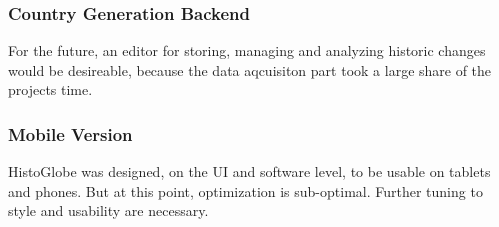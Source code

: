 \subsubsection{Country Generation Backend} %
\label{sub:country_generation_backend}
For the future, an editor for storing, managing and analyzing historic changes would be desireable, because the data aqcuisiton part took a large share of the projects time.

\subsubsection{Mobile Version} %
\label{sub:mobile_version}
HistoGlobe was designed, on the UI and software level, to be usable on tablets and phones. But at this point, optimization is sub-optimal.
Further tuning to style and usability are necessary.

